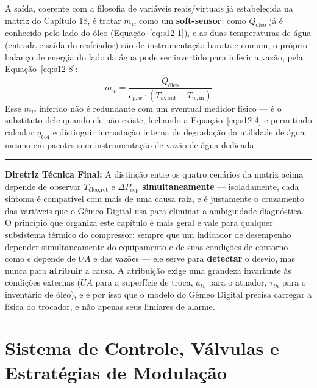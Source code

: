 \documentclass[12pt,a4paper]{article}
\numberwithin{equation}{section}
\numberwithin{table}{section}
\numberwithin{figure}{section}
\begin{document}
{	A saída, coerente com a filosofia de variáveis reais/virtuais já estabelecida na matriz do Capítulo 18, é tratar $\dot{m}_w$ como um \textbf{soft-sensor}: como $\dot{Q}_{\text{óleo}}$ já é conhecido pelo lado do óleo (Equação~\eqref{eq:s12-1}), e as duas temperaturas de água (entrada e saída do resfriador) são de instrumentação barata e comum, o próprio balanço de energia do lado da água pode ser invertido para inferir a vazão, pela Equação~\eqref{eq:s12-8}:
	\begin{equation}\label{eq:s12-8}
 \dot{m}_w = \frac{\dot{Q}_{\text{óleo}}}{c_{p,w} \cdot (T_{w,\text{out}} - T_{w,\text{in}})}
\end{equation}
	Esse $\dot{m}_w$ inferido não é redundante com um eventual medidor físico — é o substituto dele quando ele não existe, fechando a Equação~\eqref{eq:s12-4} e permitindo calcular $\eta_{UA}$ e distinguir incrustação interna de degradação da utilidade de água mesmo em pacotes sem instrumentação de vazão de água dedicada.

	\vspace{1em}
	\hrule
	\vspace{1em}

	\textbf{Diretriz Técnica Final:} A distinção entre os quatro cenários da matriz acima depende de observar $T_{\text{óleo,ret}}$ e $\Delta P_{\text{sep}}$ \textbf{simultaneamente} — isoladamente, cada sintoma é compatível com mais de uma causa raiz, e é justamente o cruzamento das variáveis que o Gêmeo Digital usa para eliminar a ambiguidade diagnóstica. O princípio que organiza este capítulo é mais geral e vale para qualquer subsistema térmico do compressor: sempre que um indicador de desempenho depender simultaneamente do equipamento e de suas condições de contorno — como $\epsilon$ depende de $UA$ e das vazões — ele serve para \textbf{detectar} o desvio, mas nunca para \textbf{atribuir} a causa. A atribuição exige uma grandeza invariante às condições externas ($UA$ para a superfície de troca, $a_{tv}$ para o atuador, $\tau_{th}$ para o inventário de óleo), e é por isso que o modelo do Gêmeo Digital precisa carregar a física do trocador, e não apenas seus limiares de alarme.

	
	\clearpage
	\section{\textbf{Sistema de Controle, Válvulas e Estratégias de Modulação}}

}
\end{document}
